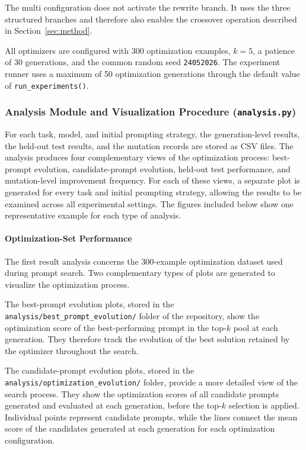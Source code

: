 \documentclass[pdflatex,sn-mathphys-num]{sn-jnl}%
\theoremstyle{thmstyleone}%
\theoremstyle{thmstyletwo}%
\theoremstyle{thmstylethree}%
\begin{document}
The multi configuration does not activate the rewrite branch. It uses
the three structured branches and therefore also enables the crossover
operation described in Section~\ref{sec:method}.

All optimizers are configured with 300 optimization examples,
\(k=5\), a patience of 30 generations, and the common random seed
\texttt{24052026}. The experiment runner uses a maximum of 50
optimization generations through the default value of
\texttt{run\_experiments()}.

\subsubsection{Analysis Module and Visualization Procedure (\texttt{analysis.py})}

For each task, model, and initial prompting strategy, the 
generation-level results, the held-out test results, and the mutation 
records are stored as CSV files. The analysis produces four complementary 
views of the optimization process: best-prompt evolution, candidate-prompt 
evolution, held-out test performance, and mutation-level improvement 
frequency. For each of these views, a separate plot is generated for 
every task and initial prompting strategy, allowing the results to be 
examined across all experimental settings. The figures included below 
show one representative example for each type of analysis.

\paragraph{Optimization-Set Performance}

The first result analysis concerns the 300-example optimization
dataset used during prompt search. Two complementary types of plots
are generated to visualize the optimization process.

The best-prompt evolution plots, stored in the
\texttt{analysis/best\_prompt\_evolution/} folder of the repository,
show the optimization score of the best-performing prompt in the
top-\(k\) pool at each generation. They therefore track the evolution
of the best solution retained by the optimizer throughout the search.

The candidate-prompt evolution plots, stored in the
\texttt{analysis/optimization\_evolution/} folder, provide a more
detailed view of the search process. They show the optimization
scores of all candidate prompts generated and evaluated at each
generation, before the top-\(k\) selection is applied. Individual
points represent candidate prompts, while the lines connect the
mean score of the candidates generated at each generation for each
optimization configuration.
\end{document}

